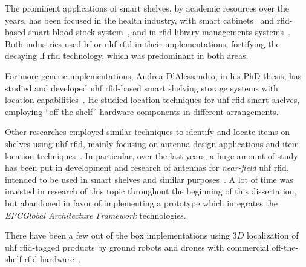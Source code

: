 The prominent applications of smart shelves, by academic resources over the years, has been focused in the health industry, with smart cabinets~\cite{shiehUsingRFIDTechnology2008, dalessandroRFIDBasedSmartShelving2012, medeirosUHFRFIDCabinet2011, gomesIntelligentMedicineCabinet2013} and \ac{rfid}-based smart blood stock system~\cite{zaricRFIDbasedSmartBlood2015}, and in \ac{rfid} library managements systems~\cite{markakisRFIDenabledLibraryManagement2013, markakisSafeEfficientDesign2014, ahmadtarmizibinabdullahLibraryShelfManagement2011, nishiyamaSmartShelfEfficient2012}.
Both industries used \acs{hf} or \acs{uhf} \ac{rfid} in their implementations, fortifying the decaying \ac{lf} \ac{rfid} technology, which was predominant in both areas.

For more generic implementations, Andrea D’Alessandro, in his PhD thesis, has studied and developed \ac{uhf} \ac{rfid}-based smart shelving storage systems with location capabilities~\cite{dalessandroRFIDBasedSmartShelving2012}.
He studied location techniques for \ac{uhf} \ac{rfid} smart shelves, employing ``off the shelf'' hardware components in different arrangements.

Other researches employed similar techniques to identify and locate items on shelves using \ac{uhf} \ac{rfid}, mainly focusing on antenna design applications and item location techniques~\cite{choiPassiveUHFRFIDBased2012, nikitinTheoryMeasurementBackscattering2007, medeirosUHFRFIDReader, yuanUHFRFIDShelf2012a}. 
In particular, over the last years, a huge amount of study has been put in development and research of antennas for \emph{near-field} \ac{uhf} \ac{rfid}, intended to be used in smart shelves and similar purposes~\cite{yuanUHFRFIDShelf2012a, liCIRCULARLYPOLARIZEDCOMPACT2013, casoModularAntennaUHF2014, ankangrenNovelDesignUHF2010, michelScalableModularAntenna2015, michelOverviewModularAntennas2016, michelDesignPerformanceAnalysis2012, parthibanLowcostScalableUHF2016, andrenkoNovelDesignUHF2013, choPlanarNearFieldRFID2011, tolinPolarizationReconfigurablePatch2019, parthibanScalableNearfieldFed2019, chenDesignSimulationUHF2018, choiUshapedSlotarrayAntenna2011, liUHFRFIDShelf2017, yuanUHFRFIDShelf2012, manziUseTransmissionLines2012, catarinucciImprovingItemlevelTracing2010, guDesignNearFieldRFID2019}.
A lot of time was invested in research of this topic throughout the beginning of this dissertation, but abandoned in favor of implementing a prototype which integrates the \emph{EPCGlobal Architecture Framework} technologies.

There have been a few out of the box implementations using $3D$ localization of \ac{uhf} \ac{rfid}-tagged products by ground robots and drones with commercial off-the-shelf \ac{rfid} hardware~\cite{tzitzisRealtime3DLocalization2020}.

